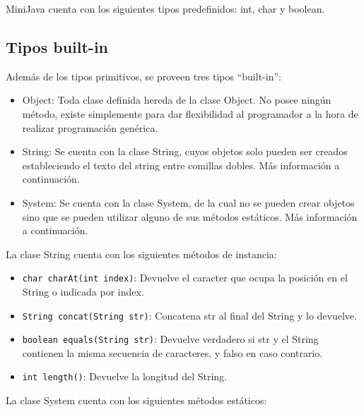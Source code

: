 \documentclass [a4paper,abstracton,titlepage]{scrartcl}
\begin{document}
MiniJava cuenta con los siguientes tipos predefinidos: int, char y boolean.

\subsection{Tipos built-in}

Además de los tipos primitivos, se proveen tres tipos ``built-in'':

\begin{itemize}
 \item Object: Toda clase definida hereda de la clase Object. No posee ningún método, existe simplemente para dar flexibilidad al programador a la hora de realizar programación genérica.
 \item String: Se cuenta con la clase String, cuyos objetos solo pueden ser creados estableciendo el texto del string entre comillas dobles. Más información a continuación.
 \item System: Se cuenta con la clase System, de la cual no se pueden crear objetos sino que se pueden utilizar alguno de sus métodos estáticos. Más información a continuación.
\end{itemize}


La clase String cuenta con los siguientes métodos de instancia:

\begin{itemize}
 \item \texttt{char charAt(int index)}: Devuelve el caracter que ocupa la posición en el String o indicada por index.
 \item \texttt{String concat(String str)}: Concatena str al final del String y lo devuelve.
 \item \texttt{boolean equals(String str)}: Devuelve verdadero si str y el String contienen la misma secuencia de caracteres, y falso en caso contrario.
 \item \texttt{int length()}: Devuelve la longitud del String.
\end{itemize}


La clase System cuenta con los siguientes métodos estáticos:
\end{document}
